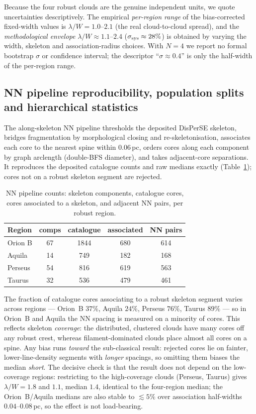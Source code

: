 \documentclass[usenatbib,twoside,twocolumn]{mnras}
\begin{document}
Because the four robust clouds are the genuine independent units, we quote uncertainties descriptively. The empirical \emph{per-region range} of the bias-corrected fixed-width values is $\lambda/W=1.0$--$2.1$ (the real cloud-to-cloud spread), and the \emph{methodological envelope} $\lambda/W\approx1.1$--$2.4$ ($\sigma_{\rm sys}\approx28\%$) is obtained by varying the width, skeleton and association-radius choices. With $N=4$ we report no formal bootstrap $\sigma$ or confidence interval; the descriptor ``$\sigma\approx0.4$'' is only the half-width of the per-region range.

\subsection{NN pipeline reproducibility, population splits and hierarchical statistics}
\label{sec:nnpipeline}

The along-skeleton NN pipeline thresholds the deposited DisPerSE skeleton, bridges fragmentation by morphological closing and re-skeletonisation, associates each core to the nearest spine within $0.06$\,pc, orders cores along each component by graph arclength (double-BFS diameter), and takes adjacent-core separations. It reproduces the deposited catalogue counts and raw medians exactly (Table~\ref{tab:nnpipeline}); cores not on a robust skeleton segment are rejected.

\begin{table}
\caption{NN pipeline counts: skeleton components, catalogue cores, cores associated to a skeleton, and adjacent NN pairs, per robust region.}
\label{tab:nnpipeline}
\footnotesize
\setlength{\tabcolsep}{4pt}
\begin{tabular}{lcccc}
\toprule
Region & comps & catalogue & associated & NN pairs \\
\midrule
Orion B & 67 & 1844 & 680 & 614 \\
Aquila  & 14 & 749  & 182 & 168 \\
Perseus & 54 & 816  & 619 & 563 \\
Taurus  & 32 & 536  & 479 & 461 \\
\bottomrule
\end{tabular}
\end{table}

The fraction of catalogue cores associating to a robust skeleton segment varies across regions --- Orion~B $37\%$, Aquila $24\%$, Perseus $76\%$, Taurus $89\%$ --- so in Orion~B and Aquila the NN spacing is measured on a minority of cores. This reflects skeleton \emph{coverage}: the distributed, clustered clouds have many cores off any robust crest, whereas filament-dominated clouds place almost all cores on a spine. Any bias runs \emph{toward} the sub-classical result: rejected cores lie on fainter, lower-line-density segments with \emph{longer} spacings, so omitting them biases the median \emph{short}. The decisive check is that the result does not depend on the low-coverage regions: restricting to the high-coverage clouds (Perseus, Taurus) gives $\lambda/W=1.8$ and $1.1$, median $1.4$, identical to the four-region median; the Orion~B/Aquila medians are also stable to $\lesssim5\%$ over association half-widths $0.04$--$0.08$\,pc, so the effect is not load-bearing.
\end{document}
